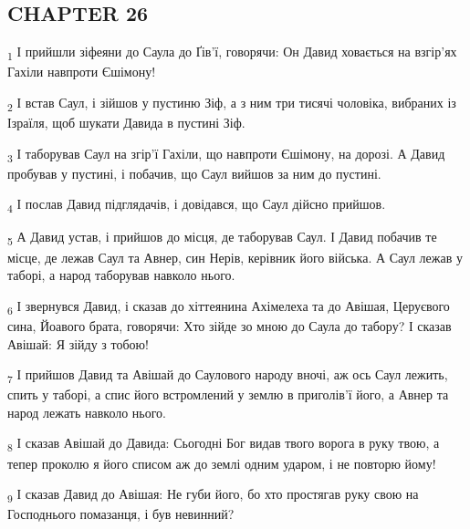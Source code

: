 \subsection{CHAPTER 26}
\begin{tcolorbox}
\textsubscript{1} І прийшли зіфеяни до Саула до Ґів'ї, говорячи: Он Давид ховається на взгір'ях Гахіли навпроти Єшімону!
\end{tcolorbox}
\begin{tcolorbox}
\textsubscript{2} І встав Саул, і зійшов у пустиню Зіф, а з ним три тисячі чоловіка, вибраних із Ізраїля, щоб шукати Давида в пустині Зіф.
\end{tcolorbox}
\begin{tcolorbox}
\textsubscript{3} І таборував Саул на згір'ї Гахіли, що навпроти Єшімону, на дорозі. А Давид пробував у пустині, і побачив, що Саул вийшов за ним до пустині.
\end{tcolorbox}
\begin{tcolorbox}
\textsubscript{4} І послав Давид підглядачів, і довідався, що Саул дійсно прийшов.
\end{tcolorbox}
\begin{tcolorbox}
\textsubscript{5} А Давид устав, і прийшов до місця, де таборував Саул. І Давид побачив те місце, де лежав Саул та Авнер, син Нерів, керівник його війська. А Саул лежав у таборі, а народ таборував навколо нього.
\end{tcolorbox}
\begin{tcolorbox}
\textsubscript{6} І звернувся Давид, і сказав до хіттеянина Ахімелеха та до Авішая, Церуєвого сина, Йоавого брата, говорячи: Хто зійде зо мною до Саула до табору? І сказав Авішай: Я зійду з тобою!
\end{tcolorbox}
\begin{tcolorbox}
\textsubscript{7} І прийшов Давид та Авішай до Саулового народу вночі, аж ось Саул лежить, спить у таборі, а спис його встромлений у землю в приголів'ї його, а Авнер та народ лежать навколо нього.
\end{tcolorbox}
\begin{tcolorbox}
\textsubscript{8} І сказав Авішай до Давида: Сьогодні Бог видав твого ворога в руку твою, а тепер проколю я його списом аж до землі одним ударом, і не повторю йому!
\end{tcolorbox}
\begin{tcolorbox}
\textsubscript{9} І сказав Давид до Авішая: Не губи його, бо хто простягав руку свою на Господнього помазанця, і був невинний?
\end{tcolorbox}

